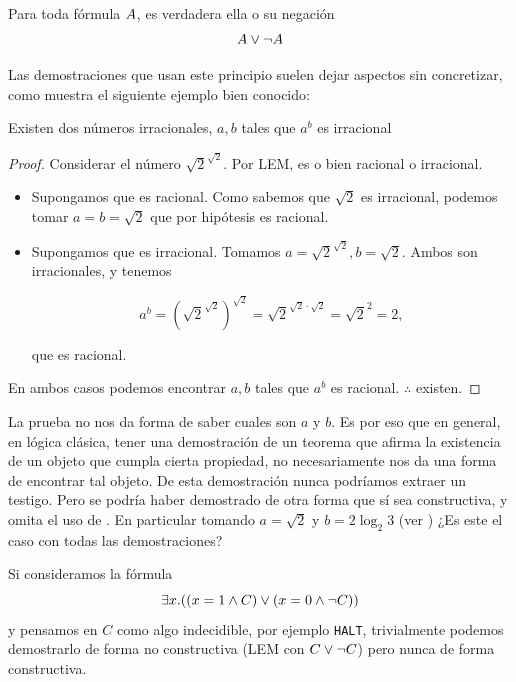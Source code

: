 \begin{prop}[LEM] Para toda fórmula $A$, es verdadera ella o su negación
    \[ A \vee \neg A \]
\end{prop}

Las demostraciones que usan este principio suelen dejar aspectos sin
concretizar, como muestra el siguiente ejemplo bien conocido:

\begin{theorem}\label{fri:thm:irrat}
    Existen dos números irracionales, $a, b$ tales que $a^b$ es irracional
\end{theorem}
\begin{proof}
    Considerar el número $\sqrt{2}^{\sqrt{2}}$. Por LEM, es o bien racional o
    irracional.
    \begin{itemize}
        \item Supongamos que es racional. Como sabemos que $\sqrt{2}$ es
              irracional, podemos tomar $a=b=\sqrt{2}$ que por hipótesis es racional.
        \item Supongamos que es irracional. Tomamos $a = \sqrt{2}^{\sqrt{2}}, b
                  = \sqrt{2}$. Ambos son irracionales, y tenemos

              \[
                  a^b
                  = \left( \sqrt{2}^{\sqrt{2}} \right)^{\sqrt{2}}
                  = \sqrt{2}^{\sqrt{2} \cdot \sqrt{2}}
                  = \sqrt{2}^{2}
                  = 2,
              \]

              que es racional.
    \end{itemize}

    En ambos casos podemos encontrar $a, b$ tales que $a^b$ es racional. $\therefore$ existen.
\end{proof}

La prueba no nos da forma de saber cuales son $a$ y $b$. Es por eso que en
general, en lógica clásica, tener una demostración de un teorema que afirma la
existencia de un objeto que cumpla cierta propiedad, no necesariamente nos da
una forma de encontrar tal objeto. De esta demostración nunca podríamos extraer un testigo. Pero se podría haber demostrado de otra forma que sí sea constructiva, y omita el uso de . En particular tomando $a = \sqrt{2}$ y $b = 2 \log_2{3}$ (ver \cite{andrej-constructive}) ¿Es este el caso con todas las demostraciones?

\begin{ejemplo}
    Si consideramos la fórmula
    \[
        \exists x . ((x = 1 \wedge C) \vee (x = 0 \wedge \neg C))
    \]
    y pensamos en $C$ como algo indecidible, por ejemplo \texttt{HALT},
    trivialmente podemos demostrarlo de forma no constructiva (LEM con $C \vee
        \neg C$) pero nunca de forma constructiva.
\end{ejemplo}

